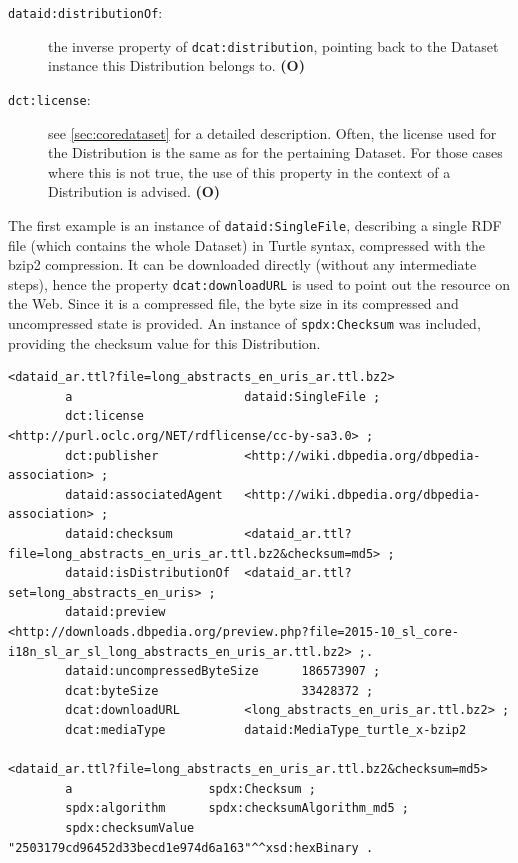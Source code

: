 \documentclass[a4paper,english,twoside,BCOR1.5cm,headsepline,DIV12,appendixprefix,final,12pt]{scrbook}
\newcommand{\prop}[1]{{{\texttt{#1}}}}
\begin{document}
\begin{description}
\item[\prop{dataid:distributionOf}:] the inverse property of \prop{dcat:distribution}, pointing back to the Dataset instance this Distribution belongs to. \textbf{(O)}
\item[\prop{dct:license}:] see \cref{sec:coredataset} for a detailed description. Often, the license used for the Distribution is the same as for the pertaining Dataset. For those cases where this is not true, the use of this property in the context of a Distribution is advised. \textbf{(O)}
\end{description}

The first example is an instance of \prop{dataid:SingleFile}, describing a single RDF file (which contains the whole Dataset) in Turtle syntax, compressed with the bzip2 compression. It can be downloaded directly (without any intermediate steps), hence the property \prop{dcat:downloadURL} is used to point out the resource on the Web. Since it is a compressed file, the byte size in its compressed and uncompressed state is provided. An instance of \prop{spdx:Checksum} was included, providing the checksum value for this Distribution.
\\
\begin{lstlisting}[language=ttl, captionpos=b,caption=A single file Distribution,label=lst:coresuperset,linewidth=\columnwidth,breaklines=true]
<dataid_ar.ttl?file=long_abstracts_en_uris_ar.ttl.bz2>
        a                        dataid:SingleFile ;
        dct:license              <http://purl.oclc.org/NET/rdflicense/cc-by-sa3.0> ;                              
        dct:publisher            <http://wiki.dbpedia.org/dbpedia-association> ;
        dataid:associatedAgent   <http://wiki.dbpedia.org/dbpedia-association> ;
        dataid:checksum          <dataid_ar.ttl?file=long_abstracts_en_uris_ar.ttl.bz2&checksum=md5> ;            
        dataid:isDistributionOf  <dataid_ar.ttl?set=long_abstracts_en_uris> ;                                     
        dataid:preview           <http://downloads.dbpedia.org/preview.php?file=2015-10_sl_core-i18n_sl_ar_sl_long_abstracts_en_uris_ar.ttl.bz2> ;.
        dataid:uncompressedByteSize      186573907 ;                                                              
        dcat:byteSize                    33428372 ;                                                               
        dcat:downloadURL         <long_abstracts_en_uris_ar.ttl.bz2> ;                                            
        dcat:mediaType           dataid:MediaType_turtle_x-bzip2                                                  

<dataid_ar.ttl?file=long_abstracts_en_uris_ar.ttl.bz2&checksum=md5>                                               
        a                   spdx:Checksum ;
        spdx:algorithm      spdx:checksumAlgorithm_md5 ;                                                          
        spdx:checksumValue  "2503179cd96452d33becd1e974d6a163"^^xsd:hexBinary .  
\end{lstlisting}
\end{document}
